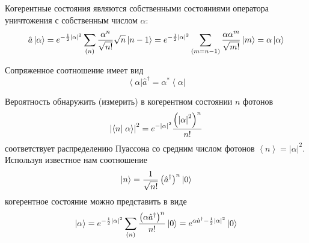 Когерентные состояния являются собственными состояниями оператора
уничтожения с собственным числом $\alpha$: 
\begin{equation}
\hat{a}\left|\alpha\right> = e^{-\frac{1}{2} \left|\alpha\right|^2}
\sum_{(n)} \frac{\alpha^n}{\sqrt{n!}}\sqrt{n}\ket{n - 1} = 
e^{-\frac{1}{2} \left|\alpha\right|^2}
\sum_{(m = n - 1)} \frac{\alpha \alpha^m}{\sqrt{m!}}\ket{m} = 
\alpha\left|\alpha\right>
\end{equation}

Сопряженное соотношение имеет вид
\begin{equation}
\left<\alpha\right|\hat{a}^{\dag} =  
\alpha^{*}\left<\alpha\right|
\end{equation}

Вероятность обнаружить (измерить) в когерентном состоянии $n$ фотонов
\begin{equation}
\left|\bra{n}\left.\alpha\right>\right|^2 =
e^{-\left|\alpha\right|^2}
\frac{\left(\left|\alpha\right|^2\right)^n}{n!}
\label{eqCh1_PuassonCoh}
\end{equation}
соответствует распределению Пуассона со средним числом фотонов  
$\left<n\right> = \left|\alpha\right|^2$.  Используя известное нам
соотношение 
\begin{equation}
\ket{n} = \frac{1}{\sqrt{n!}}
\left(\hat{a}^{\dag}\right)^n\ket{0}
\label{eqCh1_nstate}
\end{equation}
когерентное состояние можно представить в виде
\begin{equation}
\left|\alpha\right> = e^{-\frac{1}{2} \left|\alpha\right|^2}\sum_{(n)}
\frac{\left(\alpha \hat{a}^{\dag}\right)^n}{n!}\ket{0} = 
e^{\alpha \hat{a}^{\dag} -
  \frac{1}{2}\left|\alpha\right|^2}\ket{0}
\label{eqCh1_astate}
\end{equation}


